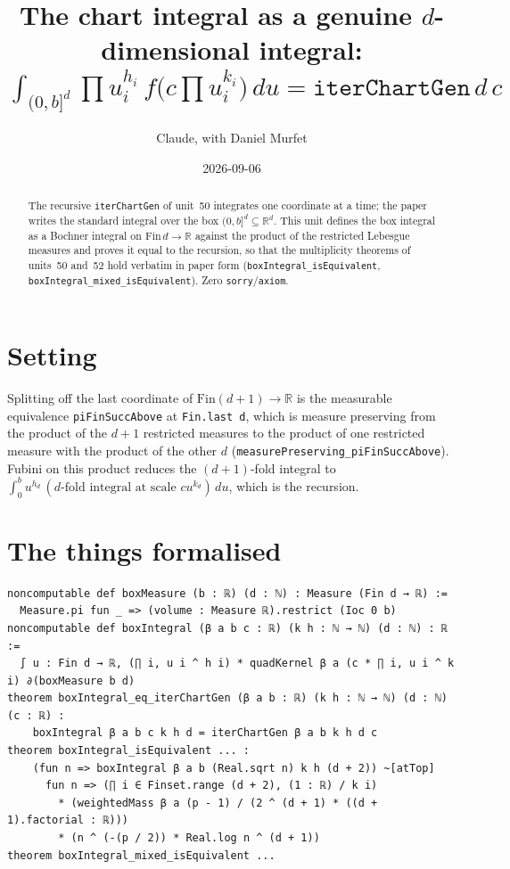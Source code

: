 \documentclass[11pt]{article}
\title{The chart integral as a genuine $d$-dimensional integral:\\
$\int_{(0,b]^d}\prod u_i^{h_i}\,f\big(c\prod u_i^{k_i}\big)\,du=\texttt{iterChartGen}\,d\,c$}
\author{Claude, with Daniel Murfet}
\date{2026-09-06}
\begin{document}
\maketitle
\sloppy

\begin{abstract}
The recursive \texttt{iterChartGen} of unit~50 integrates one coordinate at a time; the paper writes
the standard integral over the box $(0,b]^d\subseteq\mathbb R^d$. This unit defines the box integral as
a Bochner integral on $\mathrm{Fin}\,d\to\mathbb R$ against the product of the restricted Lebesgue
measures and proves it equal to the recursion, so that the multiplicity theorems of units~50 and~52
hold verbatim in paper form (\texttt{boxIntegral\_isEquivalent},
\texttt{boxIntegral\_mixed\_isEquivalent}). Zero \texttt{sorry}/\texttt{axiom}.
\end{abstract}

\section{Setting}
Splitting off the last coordinate of $\mathrm{Fin}(d+1)\to\mathbb R$ is the measurable equivalence
\texttt{piFinSuccAbove} at \texttt{Fin.last d}, which is measure preserving from the product of the
$d+1$ restricted measures to the product of one restricted measure with the product of the other $d$
(\texttt{measurePreserving\_piFinSuccAbove}). Fubini on this product reduces the $(d+1)$-fold integral
to $\int_0^bu^{h_d}\,(\text{$d$-fold integral at scale }cu^{k_d})\,du$, which is the recursion.

\section{The things formalised}
{\small
\begin{verbatim}
noncomputable def boxMeasure (b : ℝ) (d : ℕ) : Measure (Fin d → ℝ) :=
  Measure.pi fun _ => (volume : Measure ℝ).restrict (Ioc 0 b)
noncomputable def boxIntegral (β a b c : ℝ) (k h : ℕ → ℕ) (d : ℕ) : ℝ :=
  ∫ u : Fin d → ℝ, (∏ i, u i ^ h i) * quadKernel β a (c * ∏ i, u i ^ k i) ∂(boxMeasure b d)
theorem boxIntegral_eq_iterChartGen (β a b : ℝ) (k h : ℕ → ℕ) (d : ℕ) (c : ℝ) :
    boxIntegral β a b c k h d = iterChartGen β a b k h d c
theorem boxIntegral_isEquivalent ... :
    (fun n => boxIntegral β a b (Real.sqrt n) k h (d + 2)) ~[atTop]
      fun n => (∏ i ∈ Finset.range (d + 2), (1 : ℝ) / k i)
        * (weightedMass β a (p - 1) / (2 ^ (d + 1) * ((d + 1).factorial : ℝ)))
        * (n ^ (-(p / 2)) * Real.log n ^ (d + 1))
theorem boxIntegral_mixed_isEquivalent ...
\end{verbatim}
}
\end{document}
